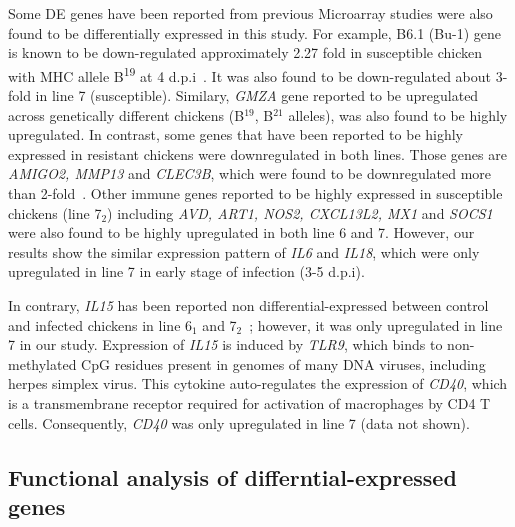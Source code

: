 \documentclass[10pt]{article}
\begin{document}
Some DE genes have been reported from previous Microarray studies were also found to be
differentially expressed in this study.
For example, B6.1 (Bu-1) gene is known to be down-regulated approximately 2.27 fold in susceptible
chicken with MHC allele B\textsuperscript{19} at 4 d.p.i~\cite{sarson2008transcriptional}.
It was also found to be down-regulated about 3-fold in line 7 (susceptible).
Similary, \textit{GMZA} gene reported to be upregulated across genetically different chickens
(B$^{19}$, B$^{21}$ alleles), was also found to be highly upregulated.
In contrast, some genes that have been reported to be highly expressed in resistant chickens were
downregulated in both lines. Those genes are \textit{AMIGO2, MMP13} and \textit{CLEC3B}, which were
found to be downregulated more than 2-fold~\cite{sarson2008transcriptional}.
Other immune genes reported to be highly expressed in susceptible chickens (line 7$_{2}$) including
\textit{AVD, ART1, NOS2, CXCL13L2, MX1} and \textit{SOCS1}~\cite{smith2011systems}
were also found to be highly upregulated in both line 6 and 7.
However, our results show the similar expression pattern of \textit{IL6} and \textit{IL18}, which were
only upregulated in line 7 in early stage of infection (3-5 d.p.i).

In contrary, \textit{IL15} has been reported non differential-expressed between control and infected chickens in
line 6$_{1}$ and 7$_{2}$~\cite{kaiser2003differential}; however,
it was only upregulated in line 7 in our study.
Expression of \textit{IL15} is induced by \textit{TLR9}, which binds to non-methylated CpG
residues present in genomes of many DNA viruses, including herpes simplex virus.
This cytokine auto-regulates the expression of \textit{CD40}, which is
a transmembrane receptor required for activation of macrophages by CD4 T cells.
Consequently, \textit{CD40} was only upregulated in line 7 (data not shown).


\subsection*{Functional analysis of differntial-expressed genes}
\end{document}
